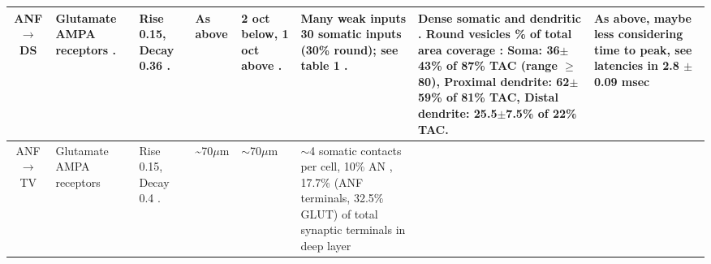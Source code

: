 \begin{longtable}{cYYYYYYY}
\\ \midrule
ANF\ensuremath{\rightarrow}DS                   
                                & %
Glutamate AMPA receptors \citep{FerragamoGoldingEtAl:1998a,WentholdHunterEtAl:1993}.
                                & %
Rise 0.15, Decay 0.36 \citep{GardnerTrussellEtAl:1999,Oertel:1983}.  
                                & %
As above
                                & %
2 oct below, 1 oct above \citep{PalmerJiangEtAl:1996}. 
                                & %
Many weak inputs \citep{FerragamoGoldingEtAl:1998a} 
30 somatic inputs (30\% round); see table 1 \citep{SmithRhode:1989}.
                                & %
Dense somatic and dendritic \citep{Cant:1981,Cant:1982,RyugoWrightEtAl:1993}.
Round vesicles \% of total area coverage \citep[cat][]{SmithRhode:1989}:
Soma: 36$\pm$43\%  of 87\% TAC (range $\geq$80), 
Proximal dendrite: 62$\pm$59\%  of 81\% TAC, 
Distal dendrite: 25.5$\pm$7.5\%  of 22\% TAC. 
                                & %
As above, maybe less considering time to peak,
see latencies in \citep{PaoliniClark:1999} 
2.8 $\pm$0.09 msec \citep[Oc FSL latency][]{RhodeSmith:1986} 
\\ \midrule
ANF \ensuremath{\rightarrow}TV          
                                & %
Glutamate AMPA receptors \citep{ZhangOertel:1993}                          
                                & %
Rise 0.15, Decay 0.4 \citep{GardnerTrussellEtAl:1999}.
                                & %
\~{}70$\mu$m \citep[mouse][]{SpirouDavisEtAl:1999}
                                & %
$\sim$70$\mu$m \citep[mouse][]{ZhangOertel:1993,SpirouDavisEtAl:1999}
                                & %
$\sim$4 somatic contacts per cell, 10\% AN \citep[guinea pig][]{Alibardi:1999}, 
17.7\% (ANF terminals, 32.5\% GLUT) of total synaptic terminals in deep layer \citep[rat][]{RubioJuiz:2004}

\end{longtable}
